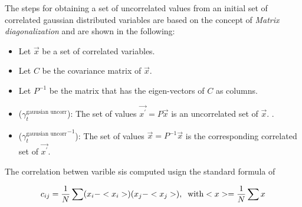 %
%

The steps for obtaining a set of uncorrelated values from an initial set of correlated gaussian distributed
variables are based on the concept of {\it Matrix diagonalization} and are shown in the following:

\begin{center}
\begin{itemize}
\item Let $\vec{x}$ be a set of correlated variables.
\item Let $C$ be the covariance matrix of $\vec{x}$.
\item Let $P^{-1}$ be the matrix that has the eigen-vectors of $C$ as columns.
\item ($\gamma_t^{\text{gauusian uncorr}}$): The set of values $\vec{x^\prime} = P\vec{x}$ is an uncorrelated set of $\vec{x}$. .
\item (${\gamma_t^{\text{gauusian uncorr}}}^{-1}$): The set of values $\vec{x} = P^{-1}\vec{x}$ is the corresponding correlated set of $\vec{x^{\prime}}$.
\end{itemize}
\end{center}

\noindent The correlation betwen varible sis computed usign the standard formula of 

\begin{equation}
\centering
c_{ij} = \frac{1}{N} \sum (x_i-<x_i>)(x_j-<x_j>), \;\; \text {with} <x> = \frac{1}{N} \sum x \nonumber
\label{hor_reww_correlation_formula}
\end{equation}

